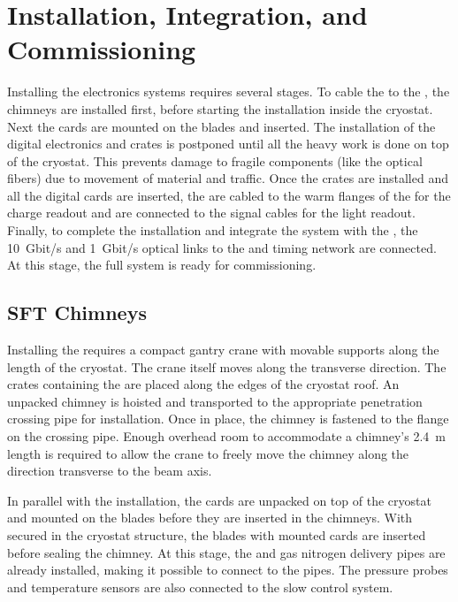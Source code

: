 \section{Installation, Integration, and Commissioning}
\label{sec:dp-tpcelec-install}

Installing the  electronics systems requires several stages. To cable the  to the , the chimneys are installed first, before starting the  installation inside the cryostat. Next the  cards are mounted on the blades and inserted. The installation of the digital electronics and  crates is postponed until all the heavy work is done on top of the cryostat. This prevents damage to fragile components (like the optical fibers) due to movement of material and traffic. 
Once the  crates are installed and all the digital cards are inserted, the  are cabled to the warm flanges of the  for the charge readout and are connected to the  signal cables for the light readout. Finally, to complete the installation and integrate the system with the , the \SI{10}{Gbit/s} and \SI{1}{Gbit/s} optical links to the  and  timing network are connected. At this stage, the full system is ready for commissioning. 

\subsection{SFT Chimneys}
\label{sec:dp-tpcelec-install-sft}

Installing the  requires a compact gantry crane with movable supports along the length of the cryostat. The crane itself moves along the transverse direction. The crates containing the  are placed along the edges of the cryostat roof. An unpacked chimney is hoisted and transported to the appropriate penetration crossing pipe for installation. Once in place, the chimney is fastened to the flange on the crossing pipe. Enough overhead room to accommodate a chimney's \SI{2.4}{m} length is required to allow the crane to freely move the chimney along the direction transverse to the beam axis. 

In parallel with the  installation, the  cards are unpacked on top of the cryostat and mounted on the blades before they are inserted in the chimneys. With  secured in the cryostat structure, the blades with mounted  cards are inserted before sealing the chimney. At this stage, the \lar and gas nitrogen delivery pipes are already installed, making it  possible to connect to the pipes. The pressure probes and temperature sensors are also connected to the slow control system.

